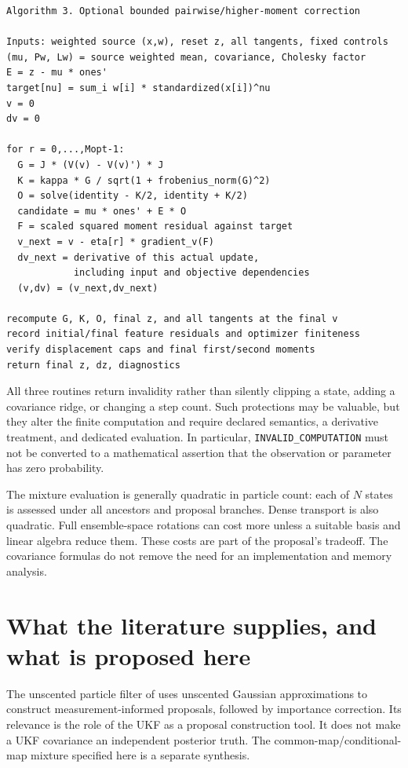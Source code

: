 \documentclass[11pt,a4paper]{article}
\begin{document}
\begin{lstlisting}
Algorithm 3. Optional bounded pairwise/higher-moment correction

Inputs: weighted source (x,w), reset z, all tangents, fixed controls
(mu, Pw, Lw) = source weighted mean, covariance, Cholesky factor
E = z - mu * ones'
target[nu] = sum_i w[i] * standardized(x[i])^nu
v = 0
dv = 0

for r = 0,...,Mopt-1:
  G = J * (V(v) - V(v)') * J
  K = kappa * G / sqrt(1 + frobenius_norm(G)^2)
  O = solve(identity - K/2, identity + K/2)
  candidate = mu * ones' + E * O
  F = scaled squared moment residual against target
  v_next = v - eta[r] * gradient_v(F)
  dv_next = derivative of this actual update,
            including input and objective dependencies
  (v,dv) = (v_next,dv_next)

recompute G, K, O, final z, and all tangents at the final v
record initial/final feature residuals and optimizer finiteness
verify displacement caps and final first/second moments
return final z, dz, diagnostics
\end{lstlisting}

All three routines return invalidity rather than silently clipping a state,
adding a covariance ridge, or changing a step count. Such protections may be
valuable, but they alter the finite computation and require declared
semantics, a derivative treatment, and dedicated evaluation. In particular,
\texttt{INVALID\_COMPUTATION} must not be converted to a mathematical assertion
that the observation or parameter has zero probability.

The mixture evaluation is generally quadratic in particle count: each of
\(N\) states is assessed under all ancestors and proposal branches.
Dense transport is also quadratic. Full ensemble-space rotations can cost
more unless a suitable basis and linear algebra reduce them. These costs
are part of the proposal's tradeoff. The covariance formulas do not remove
the need for an implementation and memory analysis.

\section{What the literature supplies, and what is proposed here}

The unscented particle filter of \citet{vandermerwe2000} uses unscented
Gaussian approximations to construct measurement-informed proposals,
followed by importance correction. Its relevance is the role of the UKF
as a proposal construction tool. It does not make a UKF covariance an
independent posterior truth. The common-map/conditional-map mixture
specified here is a separate synthesis.
\end{document}
